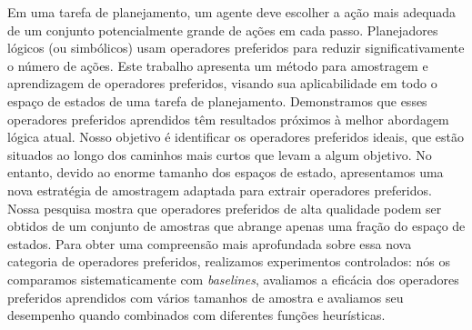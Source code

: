 \documentclass[ppgc,diss,english]{iiufrgs}
\begin{document}
\begin{translatedabstract}
Em uma tarefa de planejamento, um agente deve escolher a ação mais adequada de um conjunto potencialmente grande de ações em cada passo. Planejadores lógicos (ou simbólicos) usam operadores preferidos para reduzir significativamente o número de ações. Este trabalho apresenta um método para amostragem e aprendizagem de operadores preferidos, visando sua aplicabilidade em todo o espaço de estados de uma tarefa de planejamento. Demonstramos que esses operadores preferidos aprendidos têm resultados próximos à melhor abordagem lógica atual.
Nosso objetivo é identificar os operadores preferidos ideais, que estão situados ao longo dos caminhos mais curtos que levam a algum objetivo. No entanto, devido ao enorme tamanho dos espaços de estado, apresentamos uma nova estratégia de amostragem adaptada para extrair operadores preferidos. Nossa pesquisa mostra que operadores preferidos de alta qualidade podem ser obtidos de um conjunto de amostras que abrange apenas uma fração do espaço de estados.
Para obter uma compreensão mais aprofundada sobre essa nova categoria de operadores preferidos, realizamos experimentos controlados: nós os comparamos sistematicamente com \textit{baselines}, avaliamos a eficácia dos operadores preferidos aprendidos com vários tamanhos de amostra e avaliamos seu desempenho quando combinados com diferentes funções heurísticas.
\end{translatedabstract}
\end{document}

